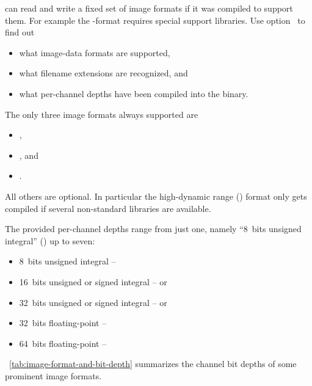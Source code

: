 \App{} can read and write a fixed set of image formats if it was compiled to support them.  For
example the -format requires special support libraries.  Use
option~ to find out

\begin{itemize}
\item
  what image-data formats are supported,

\item
  what filename extensions are recognized, and

\item
  what per-channel depths have been compiled into the \appcmd{} binary.
\end{itemize}

\noindent The only three image formats always supported are

\begin{itemize}
\item
  ,

\item
  , and

\item
  .
\end{itemize}

%
\noindent All others are optional.  In particular the high-dynamic range () format
 only gets compiled if several non-standard libraries are available.

The provided per-channel depths range from just one, namely ``8~bits
unsigned integral'' () up to seven:
  \begin{itemize}
  \item 8~bits unsigned integral -- 
  \item 16~bits unsigned or signed integral --  or 
  \item 32~bits unsigned or signed integral --  or 
  \item 32~bits floating-point -- 
  \item 64~bits floating-point -- 
  \end{itemize}

  \tableName~\ref{tab:image-format-and-bit-depth} summarizes the channel bit depths of some
  prominent image formats.

